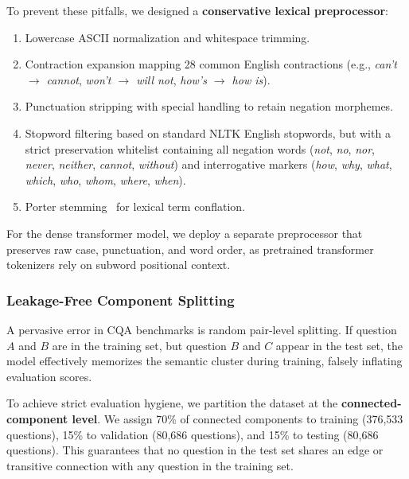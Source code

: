 \documentclass[11pt,a4paper]{article}
\begin{document}
To prevent these pitfalls, we designed a \textbf{conservative lexical preprocessor}:
\begin{enumerate}[noitemsep,topsep=1pt]
    \item Lowercase ASCII normalization and whitespace trimming.
    \item Contraction expansion mapping 28 common English contractions (e.g., \textit{can't $\to$ cannot}, \textit{won't $\to$ will not}, \textit{how's $\to$ how is}).
    \item Punctuation stripping with special handling to retain negation morphemes.
    \item Stopword filtering based on standard NLTK English stopwords, but with a strict preservation whitelist containing all negation words (\textit{not}, \textit{no}, \textit{nor}, \textit{never}, \textit{neither}, \textit{cannot}, \textit{without}) and interrogative markers (\textit{how}, \textit{why}, \textit{what}, \textit{which}, \textit{who}, \textit{whom}, \textit{where}, \textit{when}).
    \item Porter stemming~\cite{manning2008introduction} for lexical term conflation.
\end{enumerate}

For the dense transformer model, we deploy a separate preprocessor that preserves raw case, punctuation, and word order, as pretrained transformer tokenizers rely on subword positional context.

\subsubsection{Leakage-Free Component Splitting}
A pervasive error in CQA benchmarks is random pair-level splitting. If question $A$ and $B$ are in the training set, but question $B$ and $C$ appear in the test set, the model effectively memorizes the semantic cluster during training, falsely inflating evaluation scores.

To achieve strict evaluation hygiene, we partition the dataset at the \textbf{connected-component level}. We assign 70\% of connected components to training (376,533 questions), 15\% to validation (80,686 questions), and 15\% to testing (80,686 questions). This guarantees that no question in the test set shares an edge or transitive connection with any question in the training set.
\end{document}
